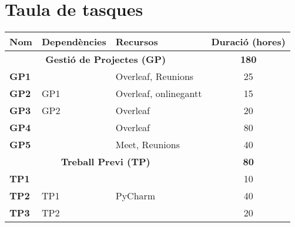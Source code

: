 \section{Taula de tasques}

{\renewcommand{\arraystretch}{1.00} %
{\setlength{\tabcolsep}{1em}   %

\begin{table}[H]
\begin{tabular}{|cllc|}
\hline
\multicolumn{1}{|l|}{\textbf{Nom}}          & \multicolumn{1}{l|}{\textbf{Dependències}} & \multicolumn{1}{l|}{\textbf{Recursos}} & \textbf{Duració (hores)} \\ \hline 
\hline
\multicolumn{3}{|c|}{\textbf{Gestió de Projectes (GP)}}                             & \textbf{180}             \\ \hline
\multicolumn{1}{|l|}{\textbf{GP1}}          & \multicolumn{1}{l|}{}                      & \multicolumn{1}{l|}{Overleaf, Reunions} & 25                       \\ \hline
\multicolumn{1}{|l|}{\textbf{GP2}}          & \multicolumn{1}{l|}{GP1}                      & \multicolumn{1}{l|}{Overleaf, onlinegantt}       & 15                       \\ \hline
\multicolumn{1}{|l|}{\textbf{GP3}}          & \multicolumn{1}{l|}{GP2}                      & \multicolumn{1}{l|}{Overleaf}               & 20                       \\ \hline
\multicolumn{1}{|l|}{\textbf{GP4}}          & \multicolumn{1}{l|}{}                      & \multicolumn{1}{l|}{Overleaf}                  & 80                       \\ \hline
\multicolumn{1}{|l|}{\textbf{GP5}}          & \multicolumn{1}{l|}{}                      & \multicolumn{1}{l|}{Meet, Reunions}    & 40                       \\ \hline
\hline
\multicolumn{3}{|c|}{\textbf{Treball Previ (TP)}}                                   & \textbf{80}              \\ \hline
\multicolumn{1}{|l|}{\textbf{TP1}}          & \multicolumn{1}{l|}{}                      & \multicolumn{1}{l|}{}                  & 10                       \\ \hline
\multicolumn{1}{|l|}{\textbf{TP2}}          & \multicolumn{1}{l|}{TP1}                      & \multicolumn{1}{l|}{PyCharm}        & 40                       \\ \hline
\multicolumn{1}{|l|}{\textbf{TP3}}          & \multicolumn{1}{l|}{TP2}                      & \multicolumn{1}{l|}{}               & 20                       \\ \hline

\end{tabular}
\end{table}}}
